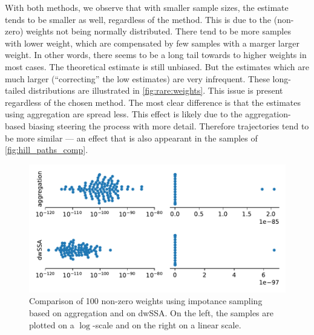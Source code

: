 With both methods, we observe that with smaller sample sizes, the estimate tends to be smaller as well, regardless of the method.
This is due to the (non-zero) weights not being normally distributed.
There tend to be more samples with lower weight, which are compensated by few samples with a marger larger weight.
In other words, there seems to be a long tail towards to higher weights in most cases.
The theoretical estimate is still unbiased.
But the estimates which are much larger (``correcting'' the low estimates) are very infrequent.
These long-tailed distributions are illustrated in \autoref{fig:rare:weights}.
This issue is present regardless of the chosen method.
The most clear difference is that the estimates using aggregation are spread less.
This effect is likely due to the aggregation-based biasing steering the process with more detail.
Therefore trajectories tend to be more similar --- an effect that is also appearant in the samples of \autoref{fig:hill_paths_comp}.
\begin{figure}[htb]
    \centering
    \includegraphics[scale=.55]{gfx/weights.pdf}
    \caption[Weight distribution of different \ac{IS} methods]{\label{fig:rare:weights}Comparison of \num{100} non-zero weights using impotance sampling based on aggregation and on dwSSA. On the left, the samples are plotted on a $\log$-scale and on the right on a linear scale.}
\end{figure}

